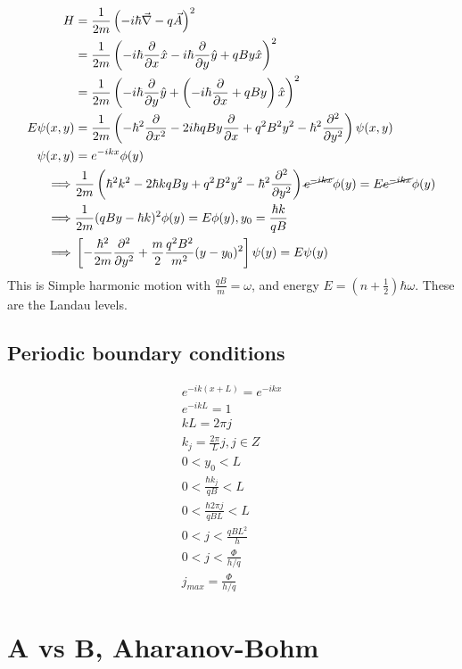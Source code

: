 \documentclass[a4paper, 11pt, normalem]{report}
\begin{document}
\begin{align}
    H &= \frac{1}{2m}\left(-i\hbar\vec{\nabla} - q\vec{A}\right)^2 \\
    &= \frac{1}{2m}\left(-i\hbar\frac{\partial}{\partial x}\hat{x} - i\hbar\frac{\partial}{\partial y}\hat{y} + qBy\hat{x}\right)^2 \\
    &= \frac{1}{2m}\left(-i\hbar\frac{\partial}{\partial y}\hat{y} + \left(-i\hbar\frac{\partial}{\partial x} + qBy\right)\hat{x}\right)^2 \\
    E\psi(x,y) &= \frac{1}{2m}\left(-\hbar^2\frac{\partial}{\partial x^2} - 2i\hbar qBy\frac{\partial}{\partial x} + q^2B^2y^2 - \hbar^2\frac{\partial^2}{\partial y^2}\right)\psi(x,y) \\
    \psi(x,y) &= e^{-ikx}\phi(y) \\
    \implies &\frac{1}{2m}\left(\hbar^2k^2 - 2\hbar kqBy + q^2B^2y^2 - \hbar^2\frac{\partial^2}{\partial y^2}\right)\cancel{e^{-ikx}}\phi(y) = E\cancel{e^{-ikx}}\phi(y)  \\
    \implies &\frac{1}{2m}(qBy - \hbar k)^2\phi(y) = E\phi(y), y_0 = \frac{\hbar k}{qB} \\
    \implies &\left[-\frac{\hbar^2}{2m}\frac{\partial^2}{\partial y^2} + \frac{m}{2}\frac{q^2B^2}{m^2}(y - y_0)^2\right]\psi(y) = E\psi(y)
\end{align}
This is Simple harmonic motion with $\frac{qB}{m} = \omega$, and energy $E = \left(n + \frac{1}{2}\right)\hbar\omega$.
These are the Landau levels.

\subsection{Periodic boundary conditions}

\begin{align}
    e^{-ik(x + L)} = e^{-ikx} \\
    e^{-ikL} = 1 \\
    kL = 2\pi j \\
    k_j = \frac{2\pi}{L}j, j \in Z \\
    0 < y_0 < L \\
    0 < \frac{\hbar k_j}{qB} < L \\
    0 < \frac{\hbar 2\pi j}{qBL} < L \\
    0 < j < \frac{qBL^2}{h} \\
    0 < j < \frac{\Phi}{h/q} \\
    j_{max} = \frac{\Phi}{h/q}
\end{align}

\section{A vs B, Aharanov-Bohm}
\end{document}
